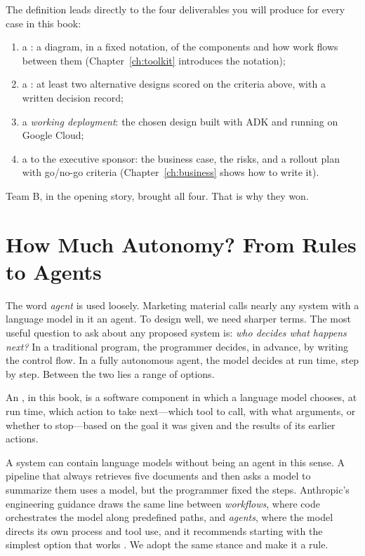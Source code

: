The definition leads directly to the four deliverables you will produce for every case in this book:
\begin{enumerate}[itemsep=1pt]
  \item a : a diagram, in a fixed notation, of the components and how work flows between them (Chapter~\ref{ch:toolkit} introduces the notation);
  \item a : at least two alternative designs scored on the criteria above, with a written decision record;
  \item a \emph{working deployment}: the chosen design built with ADK and running on Google Cloud;
  \item a  to the executive sponsor: the business case, the risks, and a rollout plan with go/no-go criteria (Chapter~\ref{ch:business} shows how to write it).
\end{enumerate}

Team B, in the opening story, brought all four. That is why they won.

\section{How Much Autonomy? From Rules to Agents}
\label{sec:autonomy}

The word \emph{agent} is used loosely. Marketing material calls nearly any system with a language model in it an agent. To design well, we need sharper terms. The most useful question to ask about any proposed system is: \emph{who decides what happens next?} In a traditional program, the programmer decides, in advance, by writing the control flow. In a fully autonomous agent, the model decides at run time, step by step. Between the two lies a range of options.

\begin{definition}
An , in this book, is a software component in which a language model chooses, at run time, which action to take next---which tool to call, with what arguments, or whether to stop---based on the goal it was given and the results of its earlier actions.
\end{definition}

A system can contain language models without being an agent in this sense. A pipeline that always retrieves five documents and then asks a model to summarize them uses a model, but the programmer fixed the steps. Anthropic's engineering guidance draws the same line between \emph{workflows}, where code orchestrates the model along predefined paths, and \emph{agents}, where the model directs its own process and tool use, and it recommends starting with the simplest option that works \citep{anthropic2024effective}. We adopt the same stance and make it a rule.

